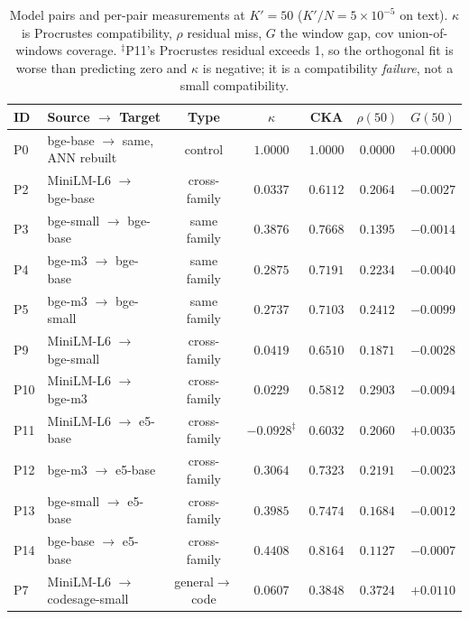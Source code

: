 \documentclass[conference]{IEEEtran}
\newcommand{\cov}{\mathrm{cov}}
\begin{document}
\begin{table}[t]
\centering
\caption{Model pairs and per-pair measurements at $K' = 50$ ($K'/N = 5\times10^{-5}$ on
text). $\kappa$ is Procrustes compatibility, $\rho$ residual miss, $G$ the window gap,
$\cov$ union-of-windows coverage. $^\ddagger$P11's Procrustes residual exceeds 1, so the
orthogonal fit is worse than predicting zero and $\kappa$ is negative; it is a
compatibility \emph{failure}, not a small compatibility.}
\label{tab:pairs}
\small
\begin{tabular}{@{}llccccc@{}}
\toprule
ID & Source $\rightarrow$ Target & Type & $\kappa$ & CKA & $\rho(50)$ & $G(50)$ \\
\midrule
P0  & bge-base $\rightarrow$ same, ANN rebuilt & control      & $1.0000$ & $1.0000$ & $0.0000$ & $+0.0000$ \\
P2  & MiniLM-L6 $\rightarrow$ bge-base         & cross-family & $0.0337$ & $0.6112$ & $0.2064$ & $-0.0027$ \\
P3  & bge-small $\rightarrow$ bge-base         & same family  & $0.3876$ & $0.7668$ & $0.1395$ & $-0.0014$ \\
P4  & bge-m3 $\rightarrow$ bge-base            & same family  & $0.2875$ & $0.7191$ & $0.2234$ & $-0.0040$ \\
P5  & bge-m3 $\rightarrow$ bge-small           & same family  & $0.2737$ & $0.7103$ & $0.2412$ & $-0.0099$ \\
P9  & MiniLM-L6 $\rightarrow$ bge-small        & cross-family & $0.0419$ & $0.6510$ & $0.1871$ & $-0.0028$ \\
P10 & MiniLM-L6 $\rightarrow$ bge-m3           & cross-family & $0.0229$ & $0.5812$ & $0.2903$ & $-0.0094$ \\
P11 & MiniLM-L6 $\rightarrow$ e5-base          & cross-family & $-0.0928^\ddagger$ & $0.6032$ & $0.2060$ & $+0.0035$ \\
P12 & bge-m3 $\rightarrow$ e5-base             & cross-family & $0.3064$ & $0.7323$ & $0.2191$ & $-0.0023$ \\
P13 & bge-small $\rightarrow$ e5-base          & cross-family & $0.3985$ & $0.7474$ & $0.1684$ & $-0.0012$ \\
P14 & bge-base $\rightarrow$ e5-base           & cross-family & $0.4408$ & $0.8164$ & $0.1127$ & $-0.0007$ \\
\midrule
P7  & MiniLM-L6 $\rightarrow$ codesage-small   & general$\to$code & $0.0607$ & $0.3848$ & $0.3724$ & $+0.0110$ \\
\bottomrule
\end{tabular}
\end{table}
\end{document}

